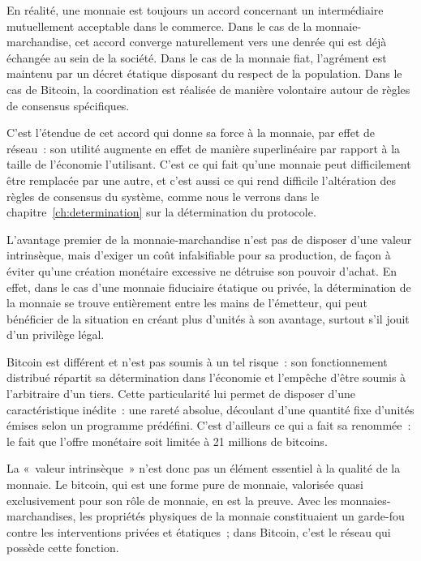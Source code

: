 En réalité, une monnaie est toujours un accord concernant un intermédiaire mutuellement acceptable dans le commerce. Dans le cas de la monnaie-marchandise, cet accord converge naturellement vers une denrée qui est déjà échangée au sein de la société. Dans le cas de la monnaie fiat, l'agrément est maintenu par un décret étatique disposant du respect de la population. Dans le cas de Bitcoin, la coordination est réalisée de manière volontaire autour de règles de consensus spécifiques.

C'est l'étendue de cet accord qui donne sa force à la monnaie, par effet de réseau~: son utilité augmente en effet de manière superlinéaire par rapport à la taille de l'économie l'utilisant. C'est ce qui fait qu'une monnaie peut difficilement être remplacée par une autre, et c'est aussi ce qui rend difficile l'altération des règles de consensus du système, comme nous le verrons dans le chapitre~\ref{ch:determination} sur la détermination du protocole.

L'avantage premier de la monnaie-marchandise n'est pas de disposer d'une valeur intrinsèque, mais d'exiger un coût infalsifiable pour sa production, de façon à éviter qu'une création monétaire excessive ne détruise son pouvoir d'achat. En effet, dans le cas d'une monnaie fiduciaire étatique ou privée, la détermination de la monnaie se trouve entièrement entre les mains de l'émetteur, qui peut bénéficier de la situation en créant plus d'unités à son avantage, surtout s'il jouit d'un privilège légal.

Bitcoin est différent et n'est pas soumis à un tel risque~: son fonctionnement distribué répartit sa détermination dans l'économie et l'empêche d'être soumis à l'arbitraire d'un tiers. Cette particularité lui permet de disposer d'une caractéristique inédite~: une rareté absolue, découlant d'une quantité fixe d'unités émises selon un programme prédéfini. C'est d'ailleurs ce qui a fait sa renommée~: le fait que l'offre monétaire soit limitée à 21 millions de bitcoins.

La «~valeur intrinsèque~» n'est donc pas un élément essentiel à la qualité de la monnaie. Le bitcoin, qui est une forme pure de monnaie, valorisée quasi exclusivement pour son rôle de monnaie, en est la preuve. Avec les monnaies-marchandises, les propriétés physiques de la monnaie constituaient un garde-fou contre les interventions privées et étatiques~; dans Bitcoin, c'est le réseau qui possède cette fonction.

